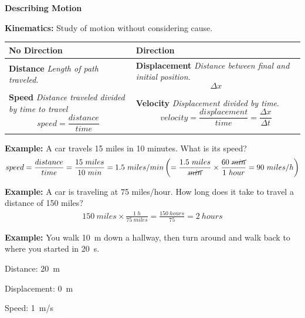 \documentclass[12pt]{article}
\begin{document}
\noindent \textbf{\large Describing Motion}

\noindent \textbf{Kinematics:} Study of motion without considering cause.
\vspace{0.1in}

\noindent \begin{tabularx}{\textwidth}{X | X}
 \textbf{No Direction} & \textbf{Direction} \\
 \hline
 \textbf{Distance} \newline \textit{Length of path traveled.} &  \textbf{Displacement} \newline \textit{Distance between final and initial position.} \begin{equation}
 \Delta x
 \end{equation}
 \\ 
 \textbf{Speed} \newline \textit{Distance traveled divided by time to travel} \begin{equation}
 speed = \frac{distance}{time}
 \end{equation} & \textbf{Velocity} \newline \textit{Displacement divided by time}. \begin{equation}
 velocity = \frac{displacement}{time} = \frac{\Delta x}{\Delta t}
 \end{equation}
\end{tabularx}
\vspace{0.1in}

\noindent \textbf{Example:} A car travels 15 miles in 10 minutes. What is its speed?
\begin{eqnarray}
speed = \frac{distance}{time} = \frac{15~miles}{10~min} = 1.5~miles/min\left(=\frac{1.5~miles}{\cancel{min}}\times\frac{60~\cancel{min}}{1~hour}=90~miles/h\right)
\end{eqnarray}

\noindent \textbf{Example:} A car is traveling at 75 miles/hour. How long does it take to travel a distance of 150 miles?
\begin{eqnarray}
150~miles \times \frac{1~h}{75~miles} = \frac{150~hours}{75} = 2~hours
\end{eqnarray}

\noindent \textbf{Example:} You walk 10~m down a hallway, then turn around and walk back to where you started in 20~s.

Distance: 20~m

Displacement: 0~m

Speed: 1~m/s
\end{document}

